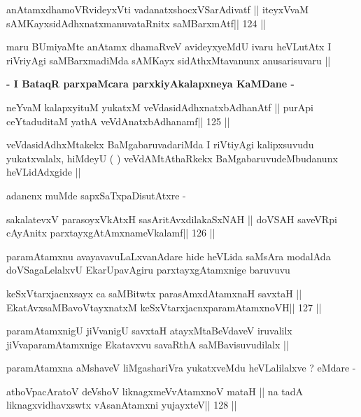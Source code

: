 \begin{shl}
anAtamxdhamoVR\s videyxVti vadanatxshocxVSarAdivatf ||
iteyxVvaM sAMKayxsidAdhxnatxmanuvataRnitx saMBarxmAtf\hfill || 124 ||
\end{shl}

\begin{artha}
maru BUmiyaMte anAtamx dhamaRveV avideyxyeMdU ivaru heVLutAtx I
riVriyAgi saMBarxmadiMda sAMKayx sidAthxMtavanunx anusarisuvaru ||
\end{artha}

\begin{center}
\textbf{- I BataqR parxpaMcara parxkiyAkalapxneya KaMDane -}
\end{center}

\begin{shl}
neYvaM kalapxyituM yukatxM veVdasidAdhxnatxbAdhanAtf ||
purA\s pi ceYtaduditaM yathA veVdAnatxbAdhanamf\hfill || 125 ||
\end{shl}

\begin{artha}
veVdasidAdhxMtakekx BaMgabaruvadariMda I riVtiyAgi kalipxsuvudu
yukatxvalalx, hiMdeyU ( ) veVdAMtAthaRkekx BaMgabaruvudeMbudanunx
heVLidAdxgide ||

adanenx muMde sapxSaTxpaDisutAtxre -
\end{artha}

\begin{shl}
sakalatevxV parasoyxVkAtxH sasAritAvxdilakaSxNAH ||
doVSAH saveVR\s pi cA\s\s yAnitx parxtayxgAtAmxnameVkalamf\hfill || 126 ||
\end{shl}

\begin{artha}
paramAtamxnu avayavavuLaLxvanAdare hide heVLida saMsAra modalAda
doVSagaLelalxvU EkarUpavAgiru parxtayxgAtamxnige baruvuvu
\end{artha}

\begin{shl}
keSxVtarxjacnxsayx ca saMBitwtx parasAmxdAtamxnaH savxtaH ||
EkatAvxsaMBavoV\s tayxnatxM keSxVtarxjacnxparamAtamxnoVH\hfill || 127 ||
\end{shl}

\begin{artha}
paramAtamxnigU jiVvanigU savxtaH atayxMtaBeVdaveV iruvalilx
jiVvaparamAtamxnige Ekatavxvu savaRthA saMBavisuvudilalx ||

paramAtamxna aMshaveV liMgashariVra yukatxveMdu heVLalilalxve ? eMdare -
\end{artha}

\begin{shl}
athoVpacAratoV deVshoV liknagxmeVvA\s\s tamxnoV mataH ||
na tadA liknagxvidhavxswtx vAsanA\s\s tamxni yujayxteV\hfill || 128 ||
\end{shl}

